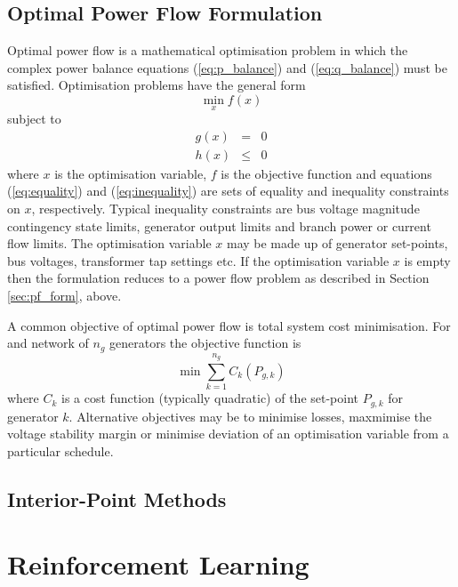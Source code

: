 \section{Optimal Power Flow Formulation}
Optimal power flow is a mathematical optimisation problem in which the complex
power balance equations (\ref{eq:p_balance}) and (\ref{eq:q_balance}) must be
satisfied.  Optimisation problems have the general form
\begin{equation}
\min_x f(x)
\end{equation}
subject to
\begin{eqnarray}
\label{eq:equality}
g(x)& =& 0\\
\label{eq:inequality}
h(x)& \leq& 0
\end{eqnarray}
where $x$ is the optimisation variable, $f$ is the objective function and
equations (\ref{eq:equality}) and (\ref{eq:inequality}) are sets of equality
and inequality constraints on $x$, respectively.  Typical inequality
constraints are bus voltage magnitude contingency state limits, generator
output limits and branch power or current flow limits.  The optimisation
variable $x$ may be made up of generator set-points, bus voltages, transformer
tap settings etc.  If the optimisation variable $x$ is empty then the
formulation reduces to a power flow problem as described in Section
\ref{sec:pf_form}, above.

A common objective of optimal power flow is total system cost minimisation.
For and network of $n_g$ generators the objective function is
\begin{equation}
\min \sum_{k=1}^{n_g} C_k(P_{g,k})
\end{equation}
where $C_k$ is a cost function (typically quadratic) of the set-point $P_{g,k}$
for generator $k$.  Alternative objectives may be to minimise losses, maxmimise
the voltage stability margin or minimise deviation of an optimisation variable
from a particular schedule.

\section{Interior-Point Methods}


\chapter{Reinforcement Learning}
\label{sec:rl}

